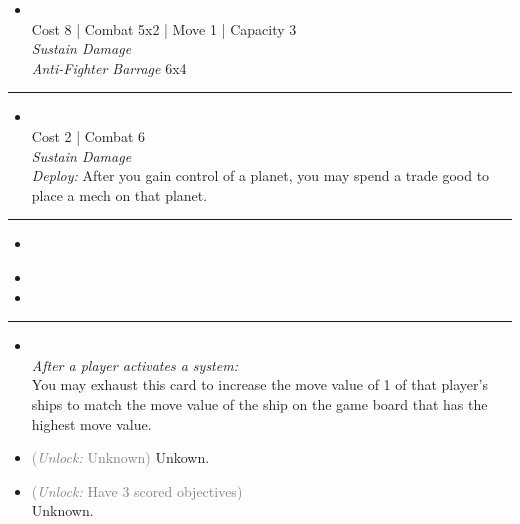 \begin{multicols}{2}

\begin{itemize}
\item {}\\
Cost 8 | Combat 5x2 | Move 1 | Capacity 3 \\
\emph{Sustain Damage}\\
\emph{Anti-Fighter Barrage} 6x4
\end{itemize}

\vspace{-10pt}\rule{\hsize}{0.4pt}\vspace{5pt}


\begin{itemize}
\item {}
\\
Cost 2 | Combat 6 \\
\emph{Sustain Damage}\\
\emph{Deploy:} After you gain control of a planet, you may spend a trade good to place a mech on that planet.
\end{itemize}

\vspace{-10pt}\rule{\hsize}{0.4pt}\vspace{5pt}


\begin{itemize}
\item \factoryI
\end{itemize}

\columnbreak
{}

\begin{itemize}
\item \factoryII
\item \chaosMapping
\end{itemize}

\vspace{-10pt}\rule{\hsize}{0.4pt}\vspace{5pt}


\begin{itemize}
\item {}\\
\emph{After a player activates a system:}\\
You may exhaust this card to increase the move value of 1 of that player's ships to match the move value of the ship on the game board that has the highest move value.
\item {} \textcolor{gray}{(\emph{Unlock:} Unknown)}
Unkown. %
\item {} \textcolor{gray}{(\emph{Unlock:} Have 3 scored objectives)}\\
Unknown.
\end{itemize}


\end{multicols}
